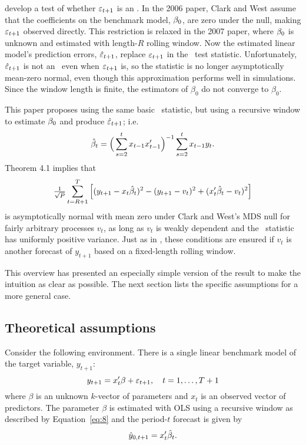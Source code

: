 \documentclass[12pt,fleqn]{article}
\begin{document}
\citet{ClW:06,ClW:07} develop a test of whether $\varepsilon_{t+1}$ is
an \mds. In the 2006 paper, Clark and West assume that the
coefficients on the benchmark model, $\btrue$, are zero under the null, making
$\varepsilon_{t+1}$ observed directly. This restriction is relaxed in
the 2007 paper, where $\btrue$ is unknown and estimated with length-$R$
rolling window. Now the estimated linear model's prediction errors,
$\hat{\varepsilon}_{t+1}$, replace $\varepsilon_{t+1}$ in the \oos\
test statistic. Unfortunately, $\hat{\varepsilon}_{t+1}$ is not an
\mds\ even when $\varepsilon_{t+1}$ is, so the statistic is no longer
asymptotically mean-zero normal, even though this approximation
performs well in simulations. Since the window length is finite,
the estimators of $\beta_0$ do not converge to $\beta_0$.

This paper proposes using the same basic \oos\ statistic, 
but using a recursive window to estimate $\btrue$ and produce
$\hat{\varepsilon}_{t+1}$; i.e.
\begin{equation}
  \label{eq:8}
  \hat{\beta}_t = \Big(\sum_{s=2}^{t} x_{t-1} x_{t-1}'\Big)^{-1}
  \sum_{s=2}^t x_{t-1} y_t.
\end{equation}
 Theorem 4.1 implies that
\begin{equation*}
  \tfrac{1}{\sqrt{P}} \sum_{t=R+1}^T \Big[(y_{t+1} -
  x_t\hat{\beta}_t)^2 - (y_{t+1} - v_t)^2 + (x_t'\hat{\beta}_t - v_t)^2 \Big]
\end{equation*}
is asymptotically normal with mean zero under Clark and West's MDS
null for fairly
arbitrary processes $v_t$, as long as $v_t$ is weakly dependent and
the \oos\ statistic has uniformly positive variance.  Just as in
\citet{ClW:06,ClW:07}, these conditions are ensured if $v_t$ is
another forecast of $y_{t+1}$ based on a fixed-length rolling window.

This overview has presented an especially simple version of the result
to make the intuition as clear as possible. The next section lists the
specific assumptions for a more general case.

\subsection{Theoretical assumptions}
\label{sec:1a}

Consider the following environment. There is a single linear
benchmark model of the target variable, $y_{t+1}$:
\begin{equation}\label{eq:1}
  y_{t+1} = x_t'\beta + \varepsilon_{t+1}, \quad t = 1,\dots,T+1
\end{equation}
where $\beta$ is an unknown $k$-vector of parameters and $x_t$ is an
observed vector of predictors. The parameter $\beta$ is
estimated with OLS using a recursive window as described by
Equation~\eqref{eq:8}
and the period-$t$ forecast is given by
\begin{equation}\label{eq:3}
  \hat{y}_{0,t+1} = x_t'\hat{\beta}_t.
\end{equation}
\end{document}
